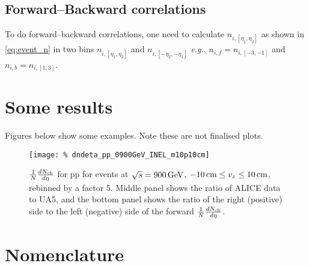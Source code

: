 \documentclass[11pt]{article}
\def\AlwaysText#1{\ifmmode\relax\text{#1}\else #1\fi}
\newcommand{\AbbrName}[1]{\AlwaysText{{\scshape #1}}}
\newcommand{\INEL}{\AbbrName{inel}}
\newcommand{\INELONE}{$\AbbrName{inel}>0$}
\newcommand{\NSD}{\AbbrName{nsd}}
\newcommand{\mult}[1][]{\ensuremath N_{\text{ch}#1}}
\newcommand{\dndeta}[1][]{{\ensuremath%
    \ifx|#1|\else\left.\fi%
    \frac{1}{N}\frac{d\mult{}}{d\eta}%
    \ifx|#1|\else\right|_{#1}\fi%
}}
\newcommand{\GeV}[1]{\unit[#1]{\AlwaysText{GeV}}}
\newcommand{\cm}[1]{\unit[#1]{\AlwaysText{cm}}}
\begin{document}
\subsection{Forward--Backward correlations} 

To do forward--backward correlations, one need to calculate
$n_{i,[\eta_1,\eta_2]}$ as shown in \eqref{eq:event_n} in two bins
$n_{i,[\eta_1,\eta_2]}$ and $n_{i,[-\eta_2,-\eta_1]}$ \textit{e.g.},
$n_{i,f}=n_{i,[-3,-1]}$ and $n_{i,b}=n_{i,[1,3]}$. 

\clearpage
\section{Some results}

Figures below show some examples.  Note these are not finalised
plots. 

\begin{figure}[hbp]
  \centering
  \texttt{[image: \%
    dndeta\_pp\_0900GeV\_INEL\_m10p10cm]}
  \caption{$\dndeta$ for pp for \INEL{} events at $\sqrt{s}=\GeV{900}$,
    $\cm{-10}\le v_z\le\cm{10}$, rebinned by a factor 5.  Middle panel
    shows the ratio of ALICE data to UA5, and the bottom panel shows
    the ratio of the right (positive) side to the left (negative) side
    of the forward $\dndeta$.}
  \label{fig:1}
\end{figure} 

\iffalse
\begin{figure}[tbp]
  \centering
  \texttt{[image: \%
    dndeta\_0900GeV\_m10-p10cm\_rb05\_inelgt0]}
  \caption{$\dndeta$ for pp for \INELONE{} events at
    $\sqrt{s}=\GeV{900}$, $\cm{-10}\le v_z\le\cm{10}$, rebinned by a
    factor 5.  Comparisons to other measurements shown where
    applicable}
  \label{fig:2}
\end{figure} 
\begin{figure}[tbp]
  \centering
  \texttt{[image: \%
    dndeta\_0900GeV\_m10-p10cm\_rb05\_nsd]}
  \caption{$\dndeta$ for pp for \NSD{} events at $\sqrt{s}=\GeV{900}$,
    $\cm{-10}\le v_z\le\cm{10}$, rebinned by a factor 5.  Comparisons
    to other measurements shown where applicable}
  \label{fig:3}
\end{figure} 
\fi

\clearpage
\appendix 
\section{Nomenclature} 
\label{app:nomen}
\end{document}
